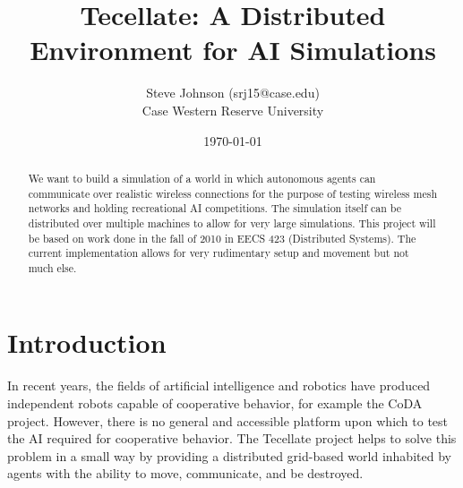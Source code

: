 \documentclass[12pt]{article}
\title{Tecellate: A Distributed Environment for AI Simulations}
\author{
        Steve Johnson (srj15@case.edu)\\
        Case Western Reserve University\\
}
\date{\today}
\begin{document}
\doublespacing
\maketitle


\begin{abstract}
    We want to build a simulation of a world in which autonomous agents can communicate over realistic wireless connections for the purpose of testing wireless mesh networks and holding recreational AI competitions. The simulation itself can be distributed over multiple machines to allow for very large simulations.
    This project will be based on work done in the fall of 2010 in EECS 423 (Distributed Systems). The current implementation allows for very rudimentary setup and movement but not much else.
\end{abstract}

\section{Introduction}

In recent years, the fields of artificial intelligence and robotics have produced independent robots capable of cooperative behavior, for example the CoDA project\cite{CoDA}. However, there is no general and accessible platform upon which to test the AI required for cooperative behavior. The Tecellate project helps to solve this problem in a small way by providing a distributed grid-based world inhabited by agents with the ability to move, communicate, and be destroyed.











\end{document}
